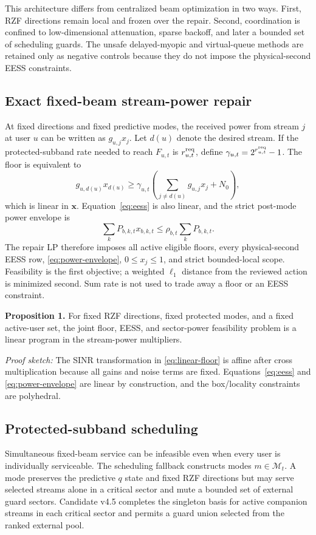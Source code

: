 \documentclass[journal]{IEEEtran}
\newcommand{\M}{\mathcal{M}}
\begin{document}
This architecture differs from centralized beam optimization in two ways. First, RZF directions remain local and frozen over the repair. Second, coordination is confined to low-dimensional attenuation, sparse backoff, and later a bounded set of scheduling guards. The unsafe delayed-myopic and virtual-queue methods are retained only as negative controls because they do not impose the physical-second EESS constraints.

\subsection{Exact fixed-beam stream-power repair}
At fixed directions and fixed predictive modes, the received power from stream $j$ at user $u$ can be written as $g_{u,j}x_j$. Let $d(u)$ denote the desired stream. If the protected-subband rate needed to reach $F_{u,t}$ is $r^{\rm req}_{u,t}$, define $\gamma_{u,t}=2^{r^{\rm req}_{u,t}}-1$. The floor is equivalent to
\begin{equation}
 g_{u,d(u)}x_{d(u)}
 \ge \gamma_{u,t}\!\left(
 \sum_{j\ne d(u)}g_{u,j}x_j+N_0\right),
 \label{eq:linear-floor}
\end{equation}
which is linear in $\bm x$. Equation~\eqref{eq:eess} is also linear, and the strict post-mode power envelope is
\begin{equation}
 \sum_k P_{b,k,t}x_{b,k,t}\le \rho_{b,t}\sum_k P_{b,k,t}.
 \label{eq:power-envelope}
\end{equation}
The repair LP therefore imposes all active eligible floors, every physical-second EESS row, \eqref{eq:power-envelope}, $0\le x_j\le1$, and strict bounded-local scope. Feasibility is the first objective; a weighted $\ell_1$ distance from the reviewed action is minimized second. Sum rate is not used to trade away a floor or an EESS constraint.

\textbf{Proposition 1.} For fixed RZF directions, fixed protected modes, and a fixed active-user set, the joint floor, EESS, and sector-power feasibility problem is a linear program in the stream-power multipliers.

\emph{Proof sketch:} The SINR transformation in \eqref{eq:linear-floor} is affine after cross multiplication because all gains and noise terms are fixed. Equations~\eqref{eq:eess} and \eqref{eq:power-envelope} are linear by construction, and the box/locality constraints are polyhedral.

\subsection{Protected-subband scheduling}
Simultaneous fixed-beam service can be infeasible even when every user is individually serviceable. The scheduling fallback constructs modes $m\in\M_t$. A mode preserves the predictive $q$ state and fixed RZF directions but may serve selected streams alone in a critical sector and mute a bounded set of external guard sectors. Candidate v4.5 completes the singleton basis for active companion streams in each critical sector and permits a guard union selected from the ranked external pool.
\end{document}
